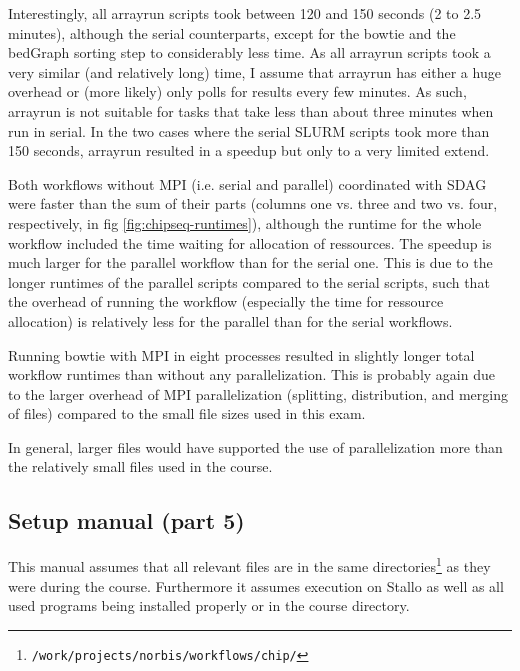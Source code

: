 \documentclass[paper=a4, 12pt]{scrartcl}
\begin{document}
Interestingly, all arrayrun scripts took between 120 and 150 seconds (2 to 2.5 minutes), although the serial counterparts, except for the bowtie and the bedGraph sorting step to considerably less time. As all arrayrun scripts took a very similar (and relatively long) time, I assume that arrayrun has either a huge overhead or (more likely) only polls for results every few minutes. As such, arrayrun is not suitable for tasks that take less than about three minutes when run in serial. In the two cases where the serial SLURM scripts took more than 150 seconds, arrayrun resulted in a speedup but only to a very limited extend.

Both workflows without MPI (i.e. serial and parallel) coordinated with SDAG were faster than the sum of their parts (columns one vs. three and two vs. four, respectively, in fig \ref{fig:chipseq-runtimes}), although the runtime for the whole workflow included the time waiting for allocation of ressources. The speedup is much larger for the parallel workflow than for the serial one. This is due to the longer runtimes of the parallel scripts compared to the serial scripts, such that the overhead of running the workflow (especially the time for ressource allocation) is relatively less for the parallel than for the serial workflows.

Running bowtie with MPI in eight processes resulted in slightly longer total workflow runtimes than without any parallelization. This is probably again due to the larger overhead of MPI parallelization (splitting, distribution, and merging of files) compared to the small file sizes used in this exam.

In general, larger files would have supported the use of parallelization more than the relatively small files used in the course.

\subsection{Setup manual (part 5)}

This manual assumes that all relevant files are in the same directories\footnote{\texttt{/work/}\allowbreak\texttt{projects/}\texttt{norbis/}\allowbreak\texttt{workflows/}\allowbreak\texttt{chip/}} as they were during the course. Furthermore it assumes execution on Stallo as well as all used programs being installed properly or in the course directory.
\end{document}
